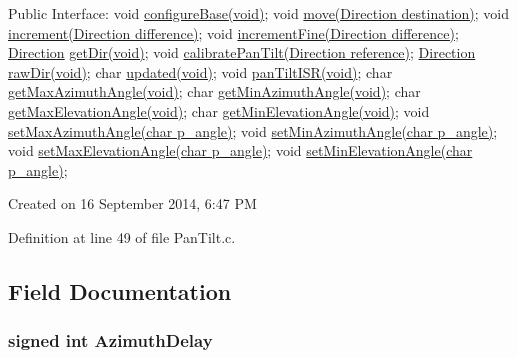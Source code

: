 Public Interface\+: void \hyperlink{_pan_tilt_8h_ab7b8c8f7bf051b4f8e3b151f7b567127}{configure\+Base(void)}; void \hyperlink{_pan_tilt_8h_a032fbfc434ca24d27d89b6d768455a42}{move(\+Direction destination)}; void \hyperlink{_pan_tilt_8h_af8e57fbe1513bb48274f4f0f46717fa1}{increment(\+Direction difference)}; void \hyperlink{_pan_tilt_8h_a5350e3f473fb25899612d382c1baa642}{increment\+Fine(\+Direction difference)}; \hyperlink{struct_direction}{Direction} \hyperlink{_pan_tilt_8h_ad1d9638bad5a5021969d19769e70c775}{get\+Dir(void)}; void \hyperlink{_pan_tilt_8h_a60e08860a1b4ca9efdc2dd43983731d5}{calibrate\+Pan\+Tilt(\+Direction reference)}; \hyperlink{struct_direction}{Direction} \hyperlink{_pan_tilt_8h_a251ee95d75c68e21c4bb933ac99e5108}{raw\+Dir(void)}; char \hyperlink{_pan_tilt_8h_a3362a0aacdd7037d0329989d353c60b7}{updated(void)}; void \hyperlink{_pan_tilt_8h_a7f353056fb02f0d95fd997198f5b186f}{pan\+Tilt\+I\+S\+R(void)}; char \hyperlink{_pan_tilt_8h_ae8f9ea5919de15d1b5614be2e5e65be3}{get\+Max\+Azimuth\+Angle(void)}; char \hyperlink{_pan_tilt_8h_af45dd498eebe7f5ba7b228c15e7221c1}{get\+Min\+Azimuth\+Angle(void)}; char \hyperlink{_pan_tilt_8h_a4278dbef7fe9034a7a54d02bcbb16de9}{get\+Max\+Elevation\+Angle(void)}; char \hyperlink{_pan_tilt_8h_af7fafa63e9c645a80f28aca253bba5cc}{get\+Min\+Elevation\+Angle(void)}; void \hyperlink{_pan_tilt_8h_a1f5e600a2655aeb9dd24b8325a777931}{set\+Max\+Azimuth\+Angle(char p\+\_\+angle)}; void \hyperlink{_pan_tilt_8h_a157ea38d68fcd31082dc2eaba2944ef3}{set\+Min\+Azimuth\+Angle(char p\+\_\+angle)}; void \hyperlink{_pan_tilt_8h_aa956697480994a26cb592b2cfcf3436c}{set\+Max\+Elevation\+Angle(char p\+\_\+angle)}; void \hyperlink{_pan_tilt_8h_a001917f3c38b200d142ab6932991e001}{set\+Min\+Elevation\+Angle(char p\+\_\+angle)};

Created on 16 September 2014, 6\+:47 P\+M 

Definition at line 49 of file Pan\+Tilt.\+c.



\subsection{Field Documentation}
\hypertarget{struct_delay_aacc83952fc6c5812597bc96d622f5317}{
\subsubsection[{Azimuth\+Delay}]{\setlength{\rightskip}{0pt plus 5cm}signed int Azimuth\+Delay}}\label{struct_delay_aacc83952fc6c5812597bc96d622f5317}


